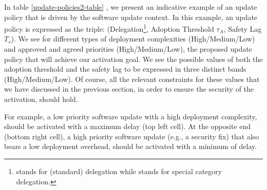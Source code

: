  In table \ref{update-policies2-table}
, we present an indicative example of an update policy that is driven by the software update context. In this example, an update policy is expressed as the triple: (Delegation\footnote{ stands for (standard) delegation while  stands for special category delegation. }, Adoption Threshold $\tau_A$, Safety Lag $T_s$). We see for different types of deployment complexities (High/Medium/Low) and approved and agreed priorities (High/Medium/Low), the proposed update policy that will achieve our activation goal. We see the possible values of both the adoption threshold and the safety lag to be expressed in three distinct bands (High/Medium/Low). Of course, all the relevant constraints for these values that we have discussed in the previous section, in order to ensure the security of the activation, should hold.

For example, a low priority software update with a high deployment complexity, should be activated with a maximum delay (top left cell). At the opposite end (bottom right cell), a high priority software update (e.g., a security fix) that also 
bears a low deployment overhead, should be activated with a minimum of delay. 

 

